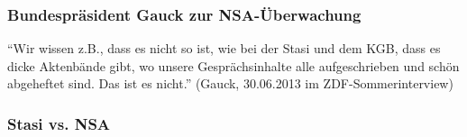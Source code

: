 \documentclass[12pt]{beamer}
\begin{document}
\begin{frame}
    \frametitle{Bundespräsident Gauck zur NSA-Überwachung}
    \begin{center}
      ``Wir wissen z.B., dass es nicht so ist, wie bei der Stasi und dem KGB, dass es dicke Aktenbände gibt, wo unsere Gesprächsinhalte alle aufgeschrieben und schön abgeheftet sind. Das ist es nicht.''
      (Gauck, 30.06.2013 im ZDF-Sommerinterview)
    \end{center}
\end{frame}

\begin{frame}
    \frametitle{Stasi vs. NSA}
    \begin{center}
    \end{center}
\end{frame}
\end{document}
